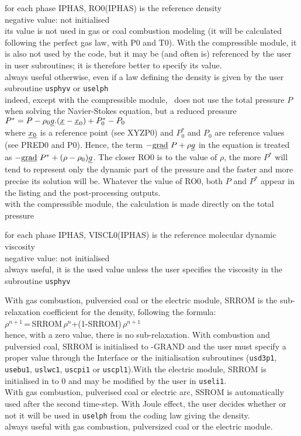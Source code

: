 {for each phase IPHAS, RO0(IPHAS) is the reference density\\
negative value: not initialised\\
its value is not used in gas or coal combustion modeling (it
will be calculated following the perfect gas law, with P0 and T0). With the
compressible module, it is also not used by the code, but it may be (and often
is) referenced by the user in user subroutines; it is therefore better to
specify its value.\\
always useful otherwise, even if a law defining the density is given by
the user subroutine \texttt{usphyv} or \texttt{uselph}\\
indeed, except with the
compressible module, \CS\ does not
use the total pressure $P$ when solving the Navier-Stokes equation, but a
reduced pressure \\
$P^*=P-\rho_0\underline{g}.(\underline{x}-\underline{x}_0)+P^*_0-P_0$\\
where
$\underline{x_0}$ is a reference point (see XYZP0) and $P^*_0$ and $P_0$ are
reference values (see PRED0 and P0). Hence, the term
$-\text{g}\underline{\text{rad}}\ {P}+\rho\underline{g}$ in the equation is treated as 
$-\text{g}\underline{\text{rad}}\ {P^*}+(\rho-\rho_0)\underline{g}$. The closer RO0 is to the value of $\rho$,
the more $P^*$ will tend to represent only the dynamic part of the pressure and
the faster and more precise its solution will be. Whatever the value of RO0,
both $P$ and $P^*$ appear in the listing and the post-processing outputs.\\
with the compressible module, the calculation is made directly on the total
pressure}

{for each phase IPHAS,  VISCL0(IPHAS) is the reference molecular dynamic
viscosity\\ 
negative value: not initialised\\
always useful, it is the used value unless the user specifies the
viscosity in the subroutine \texttt{usphyv}}

{With gas combustion, pulversied coal or the electric module, SRROM
 is the sub-relaxation coefficient for the density, following the formula:\\
$\rho^{n+1}$\,=\,SRROM\,$\rho^n$+(1-SRROM)\,$\rho^{n+1}$\\
hence, with a zero value, there is no sub-relaxation.
With combustion and pulversied coal, SRROM is initialised to -GRAND 
and the user must specify a proper value through the Interface or the
initialisation subroutines (\texttt{usd3p1},
 \texttt{usebu1}, \texttt{uslwc1}, \texttt{uscpi1} or
\texttt{uscpl1}).With the electric module, SRROM is initialised in to 0 
and may be modified by the user in \texttt{useli1}.\\
With gas combustion, pulverised coal or electric arc, SSROM is
automatically used after the second time-step. With Joule effect,
the user decides whether or not it will be used in \texttt{uselph}  
from the coding law giving the density.}\\
always useful with gas combustion, pulversized coal or the electric module.

